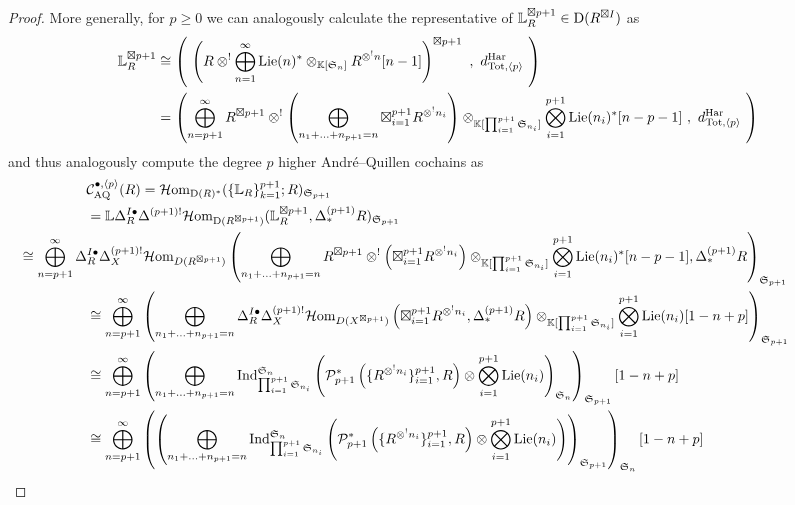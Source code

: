 \documentclass[11pt]{amsart}
\numberwithin{equation}{section}
\theoremstyle{definition}
\newcommand{\bb}{\mathbb}
\newcommand{\mc}{\mathcal}
\newcommand{\mf}{\mathfrak}
\newcommand{\Har}{{\textup{Har}}}
\newcommand{\AQ}{{\textup{AQ}}}
\newcommand{\bL}{{\mathbb{L}}}
\newcommand{\K}{{\bb K}}
\newcommand{\Ind}{{\textup{Ind}}}
\newcommand{\Lie}{{\textup{Lie}}}
\newcommand{\Homi}{{\mc H\textup{om}}}
\newcommand{\Ss}{{{\mf{S}}}}
\newcommand{\0}{{\textbf{0}}}
\newcommand{\Dd}{{\textup{D}}}
\newcommand{\DD}{{D}}
\def \mf{\mathfrak}
\begin{document}
\begin{proof}
More generally, for $p\geq 0$ we can analogously calculate the representative of $\bL_R^{\boxtimes p+1}\in \Dd(R^{\boxtimes I})$ as
\begin{align*}
	\bL_R^{\boxtimes p+1} & \cong \left( \  \left( R \otimes^! \bigoplus_{n=1}^\infty \Lie(n)^*\otimes_{\K[\Ss_n]} R^{\otimes^! n}[n-1] \right)^{\boxtimes p+1} \ , \ d^\Har_{\textup{Tot},\langle p \rangle } \ \right) \\ 
	& = \left( \bigoplus_{n=p+1}^\infty R^{\boxtimes p+1} \otimes^! \left(  \bigoplus_{n_1+...+n_{p+1}=n} \boxtimes_{i=1}^{p+1} R^{\otimes^! n_{i}} \right)\otimes_{\K[\prod_{i=1}^{p+1} \Ss_{n_i}]} \bigotimes_{i=1}^{p+1} \Lie(n_i)^*[n-p-1]  \ , \ d^\Har_{\textup{Tot},\langle p \rangle } \ \right) \\ 
\end{align*}
and thus analogously compute the degree $p$ higher Andr\'e--Quillen cochains as
\begin{align*}\hspace*{-3cm}
& \mc  C^{\bullet,\langle p \rangle}_\AQ(R)  = \Homi_{\Dd(R)^*}(\{\bL_R\}_{k=1}^{p+1};R)_{\Ss_{p+1}} \\
& = \bb L\Delta_R^{I\bullet}\Delta^{(p+1)!}\Homi_{\Dd(R^{\boxtimes p+1})}(\bL_R^{\boxtimes p+1}, \Delta^{(p+1)}_*R )_{\Ss_{p+1}} \\
& \hspace{-1.7cm} \cong \bigoplus_{n=p+1}^\infty    \Delta_R^{I\bullet}\Delta^{(p+1)!}_X\Homi_{\DD(R^{\boxtimes p+1})}\left( \bigoplus_{n_1+...+n_{p+1}=n} R^{\boxtimes p+1} \otimes^! \left( \boxtimes_{i=1}^{p+1} R^{\otimes^! n_{i}} \right)\otimes_{\K[\prod_{i=1}^{p+1} \Ss_{n_i}]} \bigotimes_{i=1}^{p+1} \Lie(n_i)^*[n-p-1] ,\Delta^{(p+1)}_* R \right)_{\Ss_{p+1}} \\
& \cong  \bigoplus_{n=p+1}^\infty   \left( \bigoplus_{n_1+...+n_{p+1}=n}\Delta_R^{I\bullet}\Delta^{(p+1)!}_X\Homi_{\DD(X^{\boxtimes p+1})}\left(  \boxtimes_{i=1}^{p+1} R^{\otimes^! n_{i}}  ,\Delta^{(p+1)}_* R \right)\otimes_{\K[\prod_{i=1}^{p+1} \Ss_{n_i}]} \bigotimes_{i=1}^{p+1} \Lie(n_i)[1-n+p] \right)_{\Ss_{p+1}} \\
& \cong  \bigoplus_{n=p+1}^\infty   \left(  \bigoplus_{n_1+...+n_{p+1}=n} \Ind_{\prod_{i=1}^{p+1} \Ss_{n_i}}^{\Ss_n}\left(\mc P^*_{p+1}\left(   \{R^{\otimes^! n_{i}}\}_{i=1}^{p+1}  , R \right)\otimes \bigotimes_{i=1}^{p+1} \Lie(n_i) \right)_{\Ss_n}   \right)_{\Ss_{p+1}} [1-n+p]\\
& \cong  \bigoplus_{n=p+1}^\infty   \left( \left( \bigoplus_{n_1+...+n_{p+1}=n} \Ind_{\prod_{i=1}^{p+1} \Ss_{n_i}}^{\Ss_n}\left(\mc P^*_{p+1}\left(   \{R^{\otimes^! n_{i}}\}_{i=1}^{p+1}  , R \right)\otimes \bigotimes_{i=1}^{p+1} \Lie(n_i) \right) \right)_{\Ss_{p+1}}   \right)_{\Ss_{n}}[1-n+p] \\

\end{align*}
\end{proof}
\end{document}
